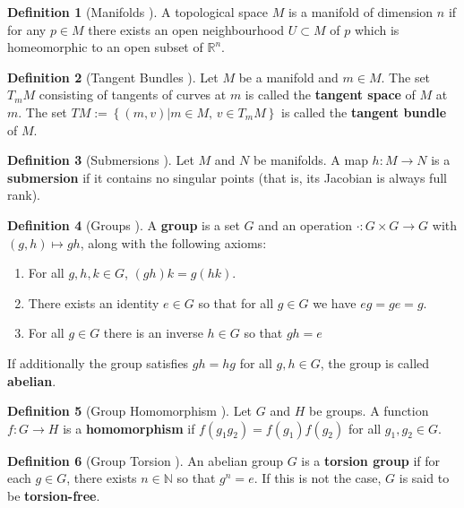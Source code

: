 \documentclass[12pt]{article}
\theoremstyle{definition}
\newtheorem{defn}{Definition}
\begin{document}
\begin{defn}[Manifolds \cite{intro-top-manifolds}]
    A topological space \(M\) is a manifold of dimension \(n\) if for any
    \(p \in M\) there exists an open neighbourhood \(U \subset M\) of \(p\)
    which is homeomorphic to an open subset of \(\mathbb{R}^n\).
\end{defn}

\begin{defn}[Tangent Bundles \cite{geometric-control}]
    Let \(M\) be a manifold and \(m \in M\). The set \(T_mM\) consisting of
    tangents of curves at \(m\) is called the \textbf{tangent space} of \(M\) at
    \(m\). The set \(TM := \left\{(m,v) | m \in M,\, v \in T_mM\right\}\) is
    called the \textbf{tangent bundle} of \(M\).
\end{defn}

\begin{defn}[Submersions \cite{robots-fiber-bundles}]
    Let \(M\) and \(N\) be manifolds. A map \(h : M \rightarrow N\) is a
    \textbf{submersion} if it contains no singular points (that is, its Jacobian
    is always full rank).
\end{defn}

\begin{defn}[Groups \cite{intro-top-manifolds}]
    A \textbf{group} is a set \(G\) and an operation 
    \(\cdot : G\times G \rightarrow G\) with \((g,h) \mapsto gh\), along with
    the following axioms:
    \begin{enumerate}
        \item For all \(g,h,k \in G\), \((gh)k = g(hk)\).
        \item There exists an identity \(e \in G\) so that for all \(g \in G\)
            we have \(eg = ge = g\).
        \item For all \(g \in G\) there is an inverse \(h \in G\) so that
        \(gh = e\)
    \end{enumerate}
    If additionally the group satisfies \(gh = hg\) for all \(g,h \in G\), the
    group is called \textbf{abelian}.
\end{defn}

\begin{defn}[Group Homomorphism \cite{intro-top-manifolds}]
    Let \(G\) and \(H\) be groups. A function \(f : G \rightarrow H\) is a
    \textbf{homomorphism} if \(f(g_1g_2) = f(g_1)f(g_2)\) for all 
    \(g_1,g_2 \in G\).
\end{defn}

\begin{defn}[Group Torsion \cite{intro-top-manifolds}]
    An abelian group \(G\) is a \textbf{torsion group} if for each \(g \in G\),
    there exists \(n \in \mathbb{N}\) so that \(g^n = e\). If this is not the
    case, \(G\) is said to be \textbf{torsion-free}.
\end{defn}
\end{document}
